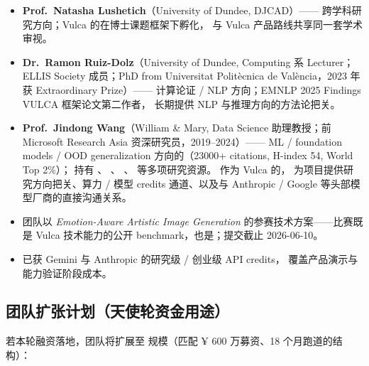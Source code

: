 \begin{itemize}
  \item {}\quad \textbf{Prof.~Natasha Lushetich}（University of Dundee, DJCAD）——
  跨学科研究方向；Vulca 的在博士课题框架下孵化，
  与 Vulca 产品路线共享同一套学术审视。
  \item {}\quad \textbf{Dr.~Ramon Ruiz-Dolz}（University of Dundee, Computing 系 Lecturer；
  ELLIS Society 成员；PhD from Universitat Politècnica de València，2023 年获 Extraordinary Prize）——
  计算论证 / NLP 方向；EMNLP 2025 Findings VULCA 框架论文第二作者，
  长期提供 NLP 与推理方向的方法论把关。
  \item {}\quad \textbf{Prof.~Jindong Wang}（William \& Mary,
  Data Science 助理教授；前 Microsoft Research Asia 资深研究员，2019–2024）——
  ML / foundation models / OOD generalization 方向的（23000+ citations, H-index 54, World Top 2\%）；
  持有 、
  、
  、
  等多项研究资源。
  作为 Vulca 的，
  为项目提供研究方向把关、算力 / 模型 credits 通道、以及与 Anthropic / Google 等头部模型厂商的直接沟通关系。
  \item {}\quad 团队以  \textit{Emotion-Aware Artistic Image Generation} 的参赛技术方案——比赛既是 Vulca 技术能力的公开 benchmark，也是；提交截止 2026-06-10。
  \item {}\quad 已获 Gemini 与 Anthropic 的研究级 / 创业级 API credits，
  覆盖产品演示与能力验证阶段成本。
\end{itemize}



\subsection{团队扩张计划（天使轮资金用途）}

若本轮融资落地，团队将扩展至 规模（匹配 ¥ 600 万募资、18 个月跑道的结构）：

